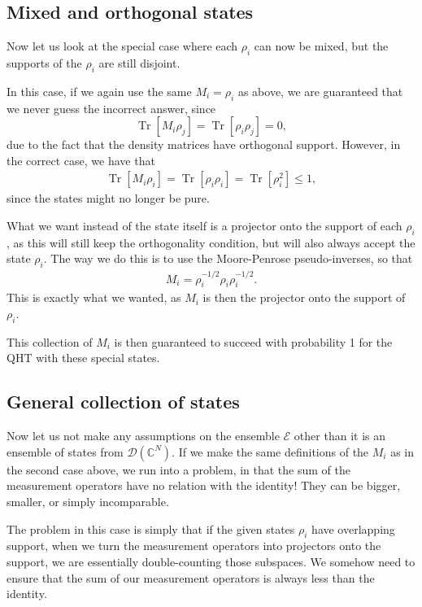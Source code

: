 \documentclass{amsart}
\theoremstyle{plain}
\theoremstyle{remark}
\newcommand{\CC}{\mathbb{C}}
\DeclareMathOperator{\tr}{Tr}
\begin{document}
\subsection{Mixed and orthogonal states}

Now let us look at the special case where each $\rho_i$ can now be mixed, but the supports of the $\rho_i$ are still disjoint.  

In this case, if we again use the same $M_i = \rho_i$ as above, we are guaranteed that we never guess the incorrect answer, since
\begin{equation}
  \tr[ M_i \rho_j] = \tr[\rho_i\rho_j] = 0,
\end{equation}
due to the fact that the density matrices have orthogonal support.  However, in the correct case, we have that
\begin{align}
  \tr[M_i \rho_i] = \tr[\rho_i\rho_i] = \tr[\rho_i^2] \leq 1,
\end{align}
since the states might no longer be pure.  

What we want instead of the state itself is a projector onto the support of each $\rho_i$, as this will still  keep the orthogonality condition, but will also always accept the state $\rho_i$.  The way we do this is to use the Moore-Penrose pseudo-inverses, so that 
\begin{align}
  M_i = \rho_i^{-1/2} \rho_i \rho_{i}^{-1/2}.
\end{align}
This is exactly what we wanted, as $M_i$ is then the projector onto the support of $\rho_i$.

This collection of $M_i$ is then guaranteed to succeed with probability 1 for the QHT with these special states.

\subsection{General collection of states}

Now let us not make any assumptions on the ensemble $\mathcal{E}$ other than it is an ensemble of states from $\mathcal{D}(\CC^N)$.  If we make the same definitions of the $M_i$ as in the second case above, we run into a problem, in that the sum of the measurement operators have no relation with the identity!  They can be bigger, smaller, or simply incomparable.

The problem in this case is simply that if the given states $\rho_i$ have overlapping support, when we turn the measurement operators into projectors onto the support, we are essentially double-counting those subspaces.  We somehow need to ensure that the sum of our measurement operators is always less than the identity.
\end{document}
